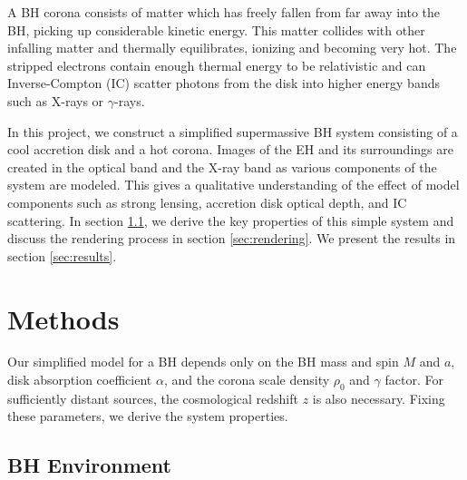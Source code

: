 \documentclass[twocolumn,twocolappendix]{aastex631}
\begin{document}
A BH corona consists of matter which has freely fallen from far away into the BH, picking up considerable kinetic energy. This matter collides with other infalling matter and thermally equilibrates, ionizing and becoming very hot. The stripped electrons contain enough thermal energy to be relativistic and can Inverse-Compton (IC) scatter photons from the disk into higher energy bands such as X-rays or $\gamma$-rays.

In this project, we construct a simplified supermassive BH system consisting of a cool accretion disk and a hot corona. Images of the EH and its surroundings are created in the optical band and the X-ray band as various components of the system are modeled. This gives a qualitative understanding of the effect of model components such as strong lensing, accretion disk optical depth, and IC scattering. In section \ref{sec:environment}, we derive the key properties of this simple system and discuss the rendering process in section \ref{sec:rendering}. We present the results in section \ref{sec:results}.

\section{Methods}

Our simplified model for a BH depends only on the BH mass and spin $M$ and $a$, disk absorption coefficient $\alpha$, and the corona scale density $\rho_0$ and $\gamma$ factor. For sufficiently distant sources, the cosmological redshift $z$ is also necessary. Fixing these parameters, we derive the system properties.

\subsection{BH Environment}
\label{sec:environment}
\end{document}
